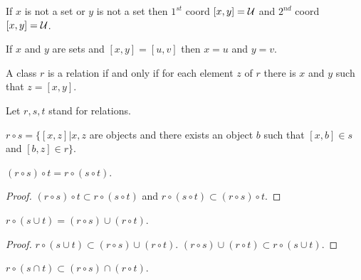 \documentclass[a4paper,draft]{amsproc}
\begin{document}
\begin{forthel}
\begin{theorem}
If $x$ is not a set or $y$ is not a set then
$1^{st}$ coord $[x,y] = \cal{U}$ and 
$2^{nd}$ coord $[x,y] = \cal{U}$.
\end{theorem}

\begin{theorem}
If $x$ and $y$ are sets and $[x,y] = [u,v]$ then
$x = u$ and $y = v$.
\end{theorem}


\begin{definition} 
A class $r$ is a relation if and only if for each element $z$ of $r$
there is $x$ and $y$ such that $z = [x,y]$.
\end{definition}

Let $r, s, t$ stand for relations.

\begin{definition}
$r \circ s = \{[x,z] | x, z$ are objects and there exists an object $b$ 
such that $[x,b] \in s$ and $[b,z] \in r\}$. 
\end{definition}

\begin{theorem}
$(r \circ s) \circ t = r \circ (s \circ t)$.
\end{theorem}
\begin{proof}
$(r \circ s) \circ t \subset r \circ (s \circ t)$ and
$r \circ (s \circ t) \subset (r \circ s) \circ t$.
\end{proof}

\begin{theorem}
$r \circ (s \cup t) = (r \circ s) \cup (r \circ t)$.
\end{theorem}
\begin{proof}
$r \circ (s \cup t) \subset (r \circ s) \cup (r \circ t)$.
$(r \circ s) \cup (r \circ t) \subset r \circ (s \cup t)$.
\end{proof}

\begin{theorem}
$r \circ (s \cap t) \subset (r \circ s) \cap (r \circ t)$.
\end{theorem}


\end{forthel}
\end{document}
